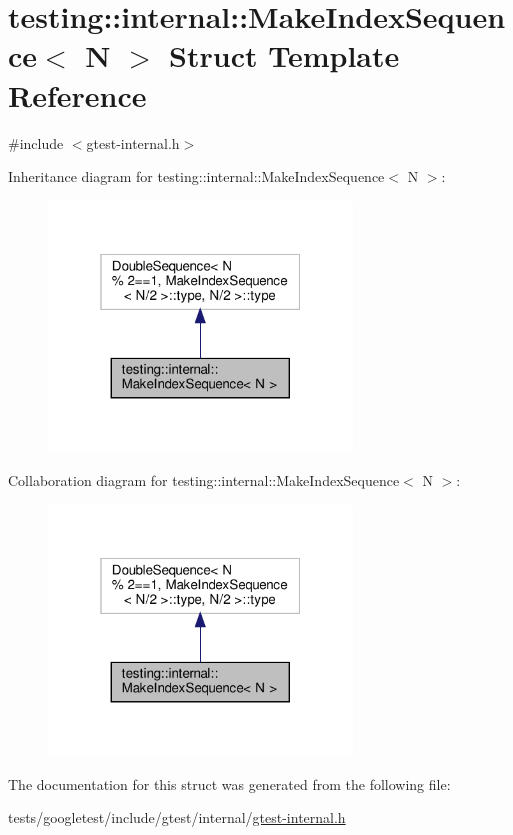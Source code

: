 \hypertarget{structtesting_1_1internal_1_1MakeIndexSequence}{}\section{testing\+:\+:internal\+:\+:Make\+Index\+Sequence$<$ N $>$ Struct Template Reference}
\label{structtesting_1_1internal_1_1MakeIndexSequence}


{\ttfamily \#include $<$gtest-\/internal.\+h$>$}



Inheritance diagram for testing\+:\+:internal\+:\+:Make\+Index\+Sequence$<$ N $>$\+:\nopagebreak
\begin{figure}[H]
\begin{center}
\leavevmode
\includegraphics[width=229pt]{structtesting_1_1internal_1_1MakeIndexSequence__inherit__graph}
\end{center}
\end{figure}


Collaboration diagram for testing\+:\+:internal\+:\+:Make\+Index\+Sequence$<$ N $>$\+:\nopagebreak
\begin{figure}[H]
\begin{center}
\leavevmode
\includegraphics[width=229pt]{structtesting_1_1internal_1_1MakeIndexSequence__coll__graph}
\end{center}
\end{figure}


The documentation for this struct was generated from the following file\+:\begin{DoxyCompactItemize}
\item 
tests/googletest/include/gtest/internal/\hyperlink{gtest-internal_8h}{gtest-\/internal.\+h}\end{DoxyCompactItemize}
